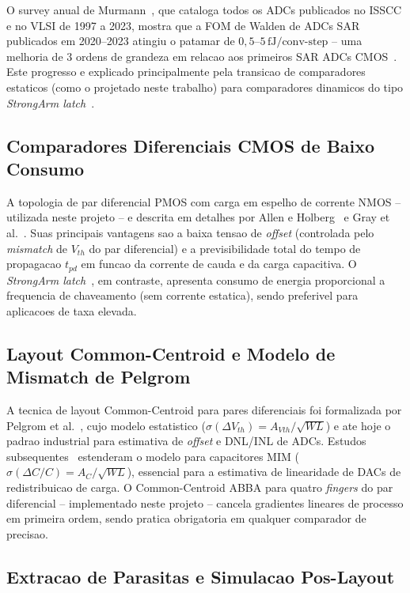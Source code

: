 \documentclass[12pt, a4paper]{article}
\begin{document}
O survey anual de Murmann~\cite{murmann2021}, que cataloga todos os ADCs publicados no ISSCC
e no VLSI de 1997 a 2023, mostra que a FOM de Walden de ADCs SAR publicados em 2020--2023
atingiu o patamar de $0{,}5$--$5\,\text{fJ/conv-step}$ -- uma melhoria de 3 ordens de
grandeza em relacao aos primeiros SAR ADCs CMOS~\cite{razavi1995}. Este progresso e explicado
principalmente pela transicao de comparadores estaticos (como o projetado neste trabalho)
para comparadores dinamicos do tipo \textit{StrongArm latch}~\cite{razavi2015}.

\subsection{Comparadores Diferenciais CMOS de Baixo Consumo}

A topologia de par diferencial PMOS com carga em espelho de corrente NMOS -- utilizada neste
projeto -- e descrita em detalhes por Allen e Holberg~\cite{allen2011} e Gray et al.~\cite{gray2009}.
Suas principais vantagens sao a baixa tensao de \textit{offset} (controlada pelo \textit{mismatch}
de $V_{th}$ do par diferencial) e a previsibilidade total do tempo de propagacao $t_{pd}$ em
funcao da corrente de cauda e da carga capacitiva. O \textit{StrongArm latch}~\cite{razavi2015},
em contraste, apresenta consumo de energia proporcional a frequencia de chaveamento
(sem corrente estatica), sendo preferivel para aplicacoes de taxa elevada.

\subsection{Layout Common-Centroid e Modelo de Mismatch de Pelgrom}

A tecnica de layout Common-Centroid para pares diferenciais foi formalizada por Pelgrom et
al.~\cite{pelgrom1989}, cujo modelo estatistico ($\sigma(\Delta V_{th}) = A_{Vth}/\sqrt{WL}$)
e ate hoje o padrao industrial para estimativa de \textit{offset} e DNL/INL de ADCs. Estudos
subsequentes~\cite{pelgrom2010} estenderam o modelo para capacitores MIM ($\sigma(\Delta C/C)
= A_C/\sqrt{WL}$), essencial para a estimativa de linearidade de DACs de redistribuicao de
carga. O Common-Centroid ABBA para quatro \textit{fingers} do par diferencial -- implementado
neste projeto -- cancela gradientes lineares de processo em primeira ordem, sendo pratica
obrigatoria em qualquer comparador de precisao.

\subsection{Extracao de Parasitas e Simulacao Pos-Layout}
\end{document}
